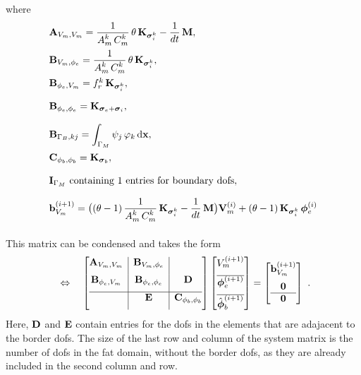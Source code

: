 where
\begin{equation*}
  \begin{array}{lll}
    \bfA_{V_m,V_m} = \dfrac{1}{A_m^k\,C_m^k}\theta\,\bfK_{\bfsigma_i^k} -\dfrac{1}{dt}\bfM,\\[4mm]
    \bfB_{V_m,\phi_e} = \dfrac{1}{A_m^k\,C_m^k}\theta\,\bfK_{\bfsigma_i^k},\\[4mm]
    \bfB_{\phi_e,V_m} = f_r^k \,\bfK_{\bfsigma_i^k},\\[4mm]
    \bfB_{\phi_e,\phi_e} = \bfK_{\bfsigma_e + \bfsigma_i},\\[4mm]
    \bfB_{\Gamma_B,kj} = \ds\int_{\Gamma_M} \psi_j\,\varphi_k \,\d\bfx,\\[4mm]
    \bfC_{\phi_b,\phi_b} = \bfK_{\bfsigma_b},\\[4mm]
    \bfI_{\Gamma_M} \text{ containing 1 entries for boundary dofs},\\[4mm]
    \bfb_{V_m}^{(i+1)} = \big((\theta-1)\, \dfrac{1}{A_m^k\,C_m^k}\bfK_{\bfsigma_i^k} - \dfrac{1}{dt}\bfM\big) \bfV_m^{(i)} 
      + (\theta - 1)\,\bfK_{\bfsigma_i^k}\,\bfphi_e^{(i)}\\[4mm]
  \end{array}
\end{equation*}

This matrix can be condensed and takes the form
\begin{equation*}
  \begin{array}{lll}
    \Leftrightarrow
    \quad 
    \left[\begin{array}{@{}c|c|c@{}}
      \bfA_{V_m,V_m} & \bfB_{V_m,\phi_e} & \\[2mm]
      \bfB_{\phi_e,V_m} & \bfB_{\phi_e,\phi_e} & \bfD \\[2mm] \hline
      &\bfE &\bfC_{\phi_b,\phi_b}\\[2mm]
    \end{array}\right]
    \left[\begin{array}{@{}c@{}}
      V_{m}^{(i+1)}  \\[2mm]\hline 
      \bfphi_{e}^{(i+1)} \\[2mm]\hline
      \hat{\bfphi}_{b}^{(i+1)}
    \end{array}\right]
    = 
    \left[\begin{array}{@{}c@{}}
      \bfb_{V_m}^{(i+1)} \\[2mm]
      \bfzero\\\hline
      \bfzero
    \end{array}\right]
  \end{array}.
\end{equation*}
Here, $\textbf{D}$ and $\textbf{E}$ contain entries for the dofs in the elements that are adajacent to the border dofs. The size of the last row and column of the system matrix is the number of dofs in the fat domain, without the border dofs, as they are already included in the second column and row.


